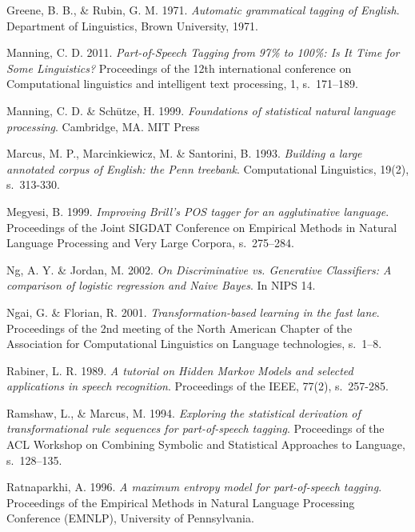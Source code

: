 \documentclass[utf8,bachelor,manualbib]{gradu3}
\begin{document}
\begin{thebibliography}{}
Greene, B. B., \& Rubin, G. M. 1971. \textit{Automatic grammatical tagging of English}. Department of Linguistics, Brown University, 1971.

Manning, C. D. 2011. \textit{Part-of-Speech Tagging from 97\% to 100\%: Is It Time for Some Linguistics?} Proceedings of the 12th international conference on Computational linguistics and intelligent text processing, 1, s.~171--189.

Manning, C. D. \& Sch\"{u}tze, H. 1999. \textit{Foundations of statistical natural language processing}.
Cambridge, MA. MIT Press

Marcus, M. P., Marcinkiewicz, M. \& Santorini, B. 1993. \textit{Building a large annotated corpus of English: the Penn treebank}. Computational Linguistics, 19(2), s.~313-330.

Megyesi, B. 1999. \textit{Improving Brill’s POS tagger for an agglutinative language}. Proceedings of the Joint SIGDAT Conference on Empirical Methods in Natural Language Processing and Very Large Corpora, s.~275--284.

Ng, A. Y. \& Jordan, M. 2002. \textit{On Discriminative vs. Generative Classifiers: A comparison of logistic regression and Naive Bayes}. In NIPS 14.

Ngai, G. \& Florian, R. 2001. \textit{Transformation-based learning in the fast lane}. Proceedings of the 2nd meeting of the North American Chapter of the Association for Computational Linguistics on Language technologies, s.~1--8.

Rabiner, L. R. 1989. \textit{A tutorial on Hidden Markov Models and selected applications in speech recognition}. Proceedings of the IEEE, 77(2), s.~257-285.

Ramshaw, L., \& Marcus, M. 1994. \textit{Exploring the statistical derivation of transformational rule sequences for part-of-speech tagging}. Proceedings of the ACL Workshop on Combining Symbolic and Statistical Approaches to Language, s.~128--135.

Ratnaparkhi, A. 1996. \textit{A maximum entropy model for part-of-speech tagging}. Proceedings of the Empirical Methods in Natural Language Processing Conference (EMNLP), University of Pennsylvania.


\end{thebibliography}
\end{document}
